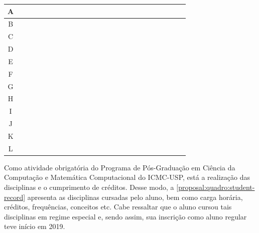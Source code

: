 \begin{quadro}[!ht]
\begin{tabular}{|c|c|c|c|c|c|c|c|c|c|c|c|c|c|c|c|c|c|c|c|c|c|c|c|c|}
  \hline
  
  \hspace{2mm}A\hspace{2mm}   
  & \y & \y & \y & \y & \y & \y & \y & \y & \y & \y & \y & \y  & \x & \x & \x & \x & \x  & \x & \x & \x & \x & \x & \x & \x\\
  \hline
  B
   & \y & \y & \y & \y & \y & \y & \y & \y & \y & \y & \x & \x  & \x & \x & \x & \x & \x  & \x & \x & \x & \x & \x & \x & \x\\
  \hline
  C
  & \x & \x & \x & \x & \x & \x & \x & \x & \x & \x & \x & \x  & \y & \y & \y & \x & \x  & \x & \x & \x & \x & \x & \x & \x\\
  \hline
  D
  & \x & \x & \x & \x & \x & \x & \x & \x & \x & \x & \x & \x  & \x & \y & \y & \x & \x  & \x & \x & \x & \x & \x & \x & \x\\
  \hline
  E
  & \x & \x & \x & \x & \x & \x & \x & \x & \x & \x & \x & \x  & \x & \x & \y & \y & \x  & \x & \x & \x & \x & \x & \x & \x\\
  \hline
  F
  & \x & \x & \x & \x & \x & \x & \x & \x & \x & \x & \x & \x  & \x & \x & \y & \y & \y  & \y & \y & \y & \y & \x & \x & \x\\
  \hline
  G
  & \x & \x & \x & \x & \x & \x & \x & \x & \x & \x & \x & \x  & \x & \x & \x & \x & \x  & \x & \x & \x & \y & \y & \y & \x\\
  \hline
  H
  & \y & \x & \x & \x & \x & \x & \x & \x & \x & \x & \x & \x  & \x & \x & \x & \x & \x  & \x & \x & \x & \x & \x & \x & \x\\
  \hline
  I
  & \y & \x & \x & \x & \x & \x & \x & \x & \x & \x & \x & \x  & \x & \x & \x & \x & \x  & \x & \x & \x & \x & \x & \x & \x\\
  \hline
  J
  & \x & \x & \x & \x & \x & \x & \y & \y & \y & \y & \y & \y  & \x & \x & \x & \x & \x  & \x & \x & \x & \x & \x & \x & \x\\
  \hline
  K
  & \x & \x & \y & \y & \y & \y & \y & \y & \y & \y & \y & \y  & \y & \y & \y & \y & \y  & \y & \y & \y & \x & \x & \x & \x\\
  \hline
  L
  & \x & \x & \x & \x & \x & \x & \x & \x & \x & \x & \x & \x  & \x & \x & \y & \y & \y  & \y & \y & \y & \y & \y & \y & \y\\
  \hline

\end{tabular}
\label{quadro:cronograma}
\normalsize
\fautor
\end{quadro}

Como atividade obrigatória do Programa de Pós-Graduação em Ciência da Computação e Matemática Computacional do ICMC-USP, está a realização das disciplinas e o cumprimento de créditos. Desse modo, a \autoref{proposal:quadro:student-record} apresenta as disciplinas cursadas pelo aluno, bem como carga horária, créditos, frequências, conceitos etc. Cabe ressaltar que o aluno cursou tais disciplinas em regime especial e, sendo assim, sua inscrição como aluno regular teve início em 2019.

